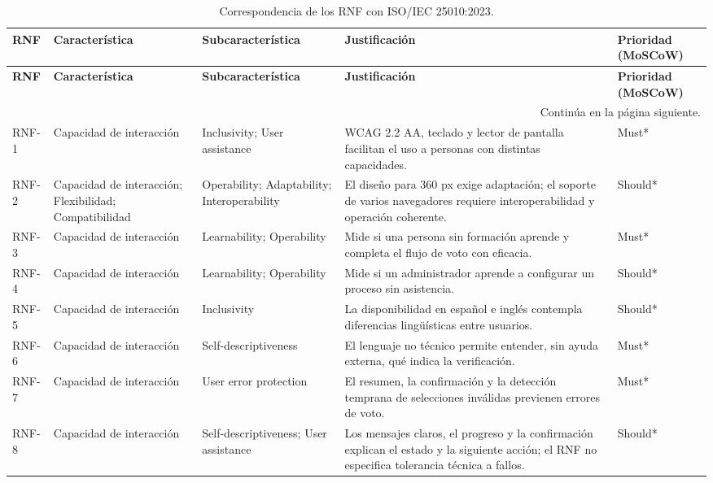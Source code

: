 \small
\setlength{\tabcolsep}{3.5pt}
\begin{longtable}{|p{}|p{}|p{}|p{}|p{}|}
\caption{Correspondencia de los RNF con ISO/IEC 25010:2023.}\label{tab:rnf-iso25010}\\
\hline
\textbf{RNF} & \textbf{Característica} & \textbf{Subcaracterística} & \textbf{Justificación} & \textbf{Prioridad (MoSCoW)} \\
\hline
\endfirsthead
\hline
\textbf{RNF} & \textbf{Característica} & \textbf{Subcaracterística} & \textbf{Justificación} & \textbf{Prioridad (MoSCoW)} \\
\hline
\endhead
\hline
\multicolumn{5}{r}{Continúa en la página siguiente.}\\
\endfoot
\hline
\endlastfoot
RNF-1 & Capacidad de interacción & Inclusivity; User assistance & WCAG 2.2 AA, teclado y lector de pantalla facilitan el uso a personas con distintas capacidades. & Must* \\
\hline
RNF-2 & Capacidad de interacción; Flexibilidad; Compatibilidad & Operability; Adaptability; Interoperability & El diseño para 360 px exige adaptación; el soporte de varios navegadores requiere interoperabilidad y operación coherente. & Should* \\
\hline
RNF-3 & Capacidad de interacción & Learnability; Operability & Mide si una persona sin formación aprende y completa el flujo de voto con eficacia. & Must* \\
\hline
RNF-4 & Capacidad de interacción & Learnability; Operability & Mide si un administrador aprende a configurar un proceso sin asistencia. & Should* \\
\hline
RNF-5 & Capacidad de interacción & Inclusivity & La disponibilidad en español e inglés contempla diferencias lingüísticas entre usuarios. & Should* \\
\hline
RNF-6 & Capacidad de interacción & Self-descriptiveness & El lenguaje no técnico permite entender, sin ayuda externa, qué indica la verificación. & Must* \\
\hline
RNF-7 & Capacidad de interacción & User error protection & El resumen, la confirmación y la detección temprana de selecciones inválidas previenen errores de voto. & Must* \\
\hline
RNF-8 & Capacidad de interacción & Self-descriptiveness; User assistance & Los mensajes claros, el progreso y la confirmación explican el estado y la siguiente acción; el RNF no especifica tolerancia técnica a fallos. & Should* \\

\end{longtable}
